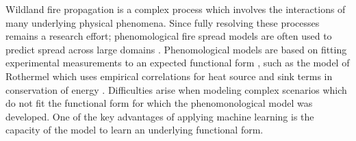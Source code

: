 \documentclass[twocolumn]{svjour3}          %
\newcommand{\etal}{\textit{et al}. }
\begin{document}
Wildland fire propagation is a complex process which involves the
interactions of many underlying physical phenomena. Since fully
resolving these processes remains a research effort; phenomological
fire spread models are often used to predict spread across large domains
\cite{sullivan2007a}. Phenomological models are based on fitting experimental
measurements to an expected functional form \cite{sullivan2007b}, such
as the model of Rothermel \cite{rothermel1972mathematical,scott2005standard} which uses
empirical correlations for heat source and sink terms in
conservation of energy \cite{weber1991modelling}. Difficulties arise when
modeling complex scenarios which do not fit the functional form for
which the phenomonological model was developed. One of the key advantages
of applying machine learning is the capacity of the model to learn an underlying
functional form.


\end{document}
